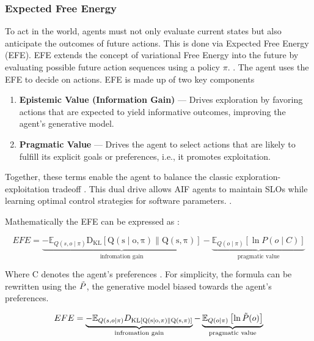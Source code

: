

 \subsubsection{Expected Free Energy}
To act in the world, agents must not only evaluate current states but also anticipate the outcomes of future actions. This is done via Expected Free Energy (EFE). EFE extends the concept of variational Free Energy into the future by evaluating possible future action sequences using a policy \(\pi\). \cite{friston_active_2016}. The agent uses the EFE to decide on actions. EFE is made up of two key components \cite{friston_active_2022} %
\begin{enumerate}
  \item \textbf{Epistemic Value (Information Gain)} — Drives exploration by favoring actions that are expected to yield informative outcomes, improving the agent’s generative model.
  \item \textbf{Pragmatic Value} — Drives the agent to select actions that are likely to fulfill its explicit goals or preferences, i.e., it promotes exploitation.
\end{enumerate}

Together, these terms enable the agent to balance the classic exploration-exploitation tradeoff \cite{sedlak_adaptive_2024}. This dual drive allows AIF
agents to maintain SLOs while learning optimal control strategies for software parameters. \cite{lapkovskis_benchmarking_2025}.

Mathematically the EFE can be expressed as \cite{parr_active_2022}:

\[
EFE=\underbrace{-\mathbb{E}_{Q(s, o \mid \pi)} \mathrm{D_{KL} \left[ Q(s \mid o, \pi) \parallel Q(s, \pi) \right] }}_{\text{infromation gain}} - \underbrace{\mathbb{E}_{Q(o \mid \pi)} \left[ \ln P(o \mid C) \right]}_{\text{pragmatic value}}
\]

Where C denotes the agent's preferences \cite{parr_active_2022}. For simplicity, the formula can be rewritten using the \(\Tilde{P}\), the generative model biased towards the agent's preferences.

\[
EFE=\underbrace{-\mathbb{E}_{Q(s, o \mid \pi)} D_\mathrm{{KL} \left[ Q(s \mid o, \pi) \parallel Q(s, \pi) \right] }}_{\text{infromation gain}} - \underbrace{\mathbb{E}_{Q(o \mid \pi)} \left[ \ln \Tilde{P}(o) \right]}_{\text{pragmatic value}}
\]




